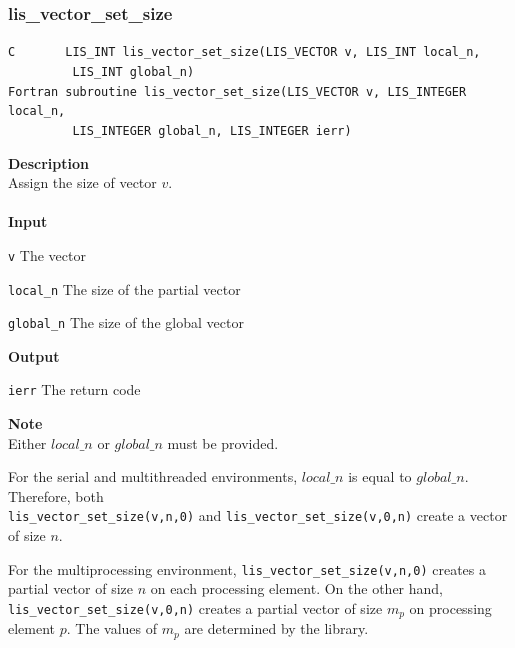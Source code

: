 \documentclass[a4paper]{article}
\newcommand{\namelistlabel}[1]{\mbox{#1}\hfill}
\newenvironment{namelist}[1]{%
\begin{list}{}
  {\let\makelabel\namelistlabel
  \settowidth{\labelwidth}{#1}
  \setlength{\leftmargin}{1.1\labelwidth}}
  }{%
\end{list}}
\begin{document}
\subsubsection{lis\_vector\_set\_size}
\begin{screen}
\verb|C       LIS_INT lis_vector_set_size(LIS_VECTOR v, LIS_INT local_n,|\\
\verb|         LIS_INT global_n)|\\
\verb|Fortran subroutine lis_vector_set_size(LIS_VECTOR v, LIS_INTEGER local_n,|\\
\verb|         LIS_INTEGER global_n, LIS_INTEGER ierr)| 
\end{screen}
{\bf Description}\\
\indent
Assign the size of vector $v$.
\\ \\
\noindent
{\bf Input}
\begin{namelist}{XXXXXXXXXXXXXXXXXXXX}
\item[\tt v] The vector
\item[\tt local\_n] The size of the partial vector
\item[\tt global\_n] The size of the global vector
\end{namelist}
{\bf Output}
\begin{namelist}{XXXXXXXXXXXXXXXXXXXX}
\item[\tt ierr] The return code
\end{namelist}
{\bf Note}\\
\indent
Either $local\_n$ or $global\_n$ must be provided.

For the serial and multithreaded environments, $local\_n$ 
is equal to $global\_n$. 
Therefore, both \\
\verb|lis_vector_set_size(v,n,0)| and \verb|lis_vector_set_size(v,0,n)| create a vector of size $n$. 

For the multiprocessing environment, \verb|lis_vector_set_size(v,n,0)| 
creates a partial vector of size $n$ on each processing element. On the other hand, 
\verb|lis_vector_set_size(v,0,n)| creates a partial vector of size 
$m_p$ on processing element $p$. The values of $m_p$ are determined by the library. 
\end{document}
